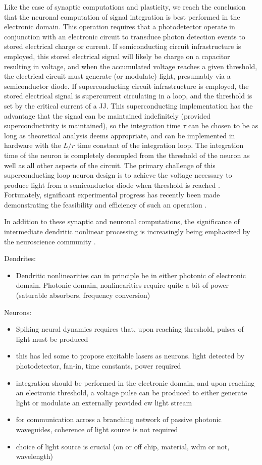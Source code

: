 \documentclass[twocolumn]{article}
\begin{document}
Like the case of synaptic computations and plasticity, we reach the conclusion that the neuronal computation of signal integration is best performed in the electronic domain. This operation requires that a photodetector operate in conjunction with an electronic circuit to transduce photon detection events to stored electrical charge or current. If semiconducting circuit infrastructure is employed, this stored electrical signal will likely be charge on a capacitor resulting in voltage, and when the accumulated voltage reaches a given threshold, the electrical circuit must generate (or modulate) light, presumably via a semiconductor diode. If superconducting circuit infrastructure is employed, the stored electrical signal is supercurrent circulating in a loop, and the threshold is set by the critical current of a JJ. This superconducting implementation has the advantage that the signal can be maintained indefinitely (provided superconductivity is maintained), so the integration time $\tau$ can be chosen to be as long as theoretical analysis deems appropriate, and can be implemented in hardware with the $L/r$ time constant of the integration loop. The integration time of the neuron is completely decoupled from the threshold of the neuron as well as all other aspects of the circuit. The primary challenge of this superconducting loop neuron design is to achieve the voltage necessary to produce light from a semiconductor diode when threshold is reached \cite{sh2018d}. Fortunately, significant experimental progress has recently been made demonstrating the feasibility and efficiency of such an operation \cite{mcve2018}.

In addition to these synaptic and neuronal computations, the significance of intermediate dendritic nonlinear processing is increasingly being emphasized by the neuroscience community \cite{stsp2015}. 

Dendrites:
\begin{itemize}
\item Dendritic nonlinearities can in principle be in either photonic of electronic domain. Photonic domain, nonlinearities require quite a bit of power (saturable absorbers, frequency conversion)
\end{itemize}

Neurons:
\begin{itemize}
\item Spiking neural dynamics requires that, upon reaching threshold, pulses of light must be produced
\item this has led some to propose excitable lasers as neurons. light detected by photodetector, fan-in, time constants, power required
\item integration should be performed in the electronic domain, and upon reaching an electronic threshold, a voltage pulse can be produced to either generate light or modulate an externally provided cw light stream
\item for communication across a branching network of passive photonic waveguides, coherence of light source is not required
\item choice of light source is crucial (on or off chip, material, wdm or not, wavelength)
\end{itemize}
\end{document}
